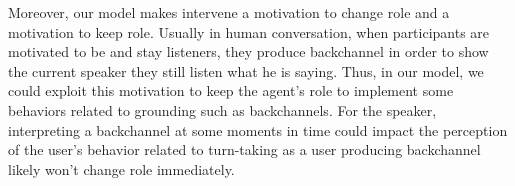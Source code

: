 Moreover, our model makes intervene a motivation to change role and a motivation to keep role. Usually in human conversation, when participants are motivated to be and stay listeners, they produce backchannel in order to show the current speaker they still listen what he is saying. Thus, in our model, we could exploit this motivation to keep the agent's role to implement some behaviors related to grounding such as backchannels. For the speaker, interpreting a backchannel at some moments in time could impact the perception of the user's behavior related to turn-taking as a user producing backchannel likely won't change role immediately.

% 
